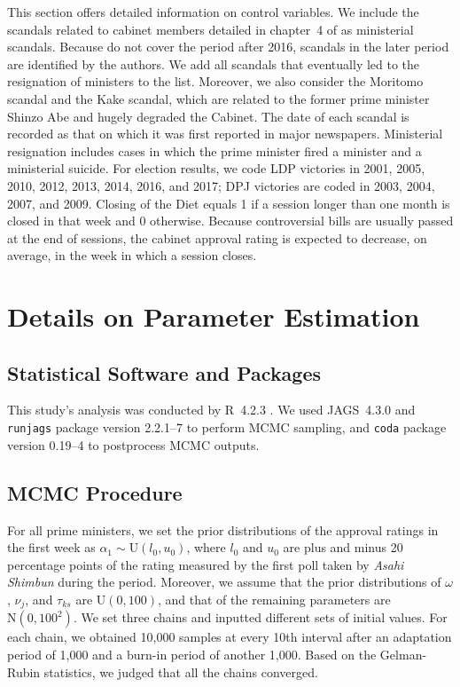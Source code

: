 \documentclass[12pt,letterpaper]{scrartcl}
\begin{document}
This section offers detailed information on control variables. We include the scandals related to cabinet members detailed in chapter~4 of \citet{Carlson2018} as ministerial scandals. Because \citet{Carlson2018} do not cover the period after 2016, scandals in the later period are identified by the authors. We add all scandals that eventually led to the resignation of ministers to the list. Moreover, we also consider the Moritomo scandal and the Kake scandal, which are related to the former prime minister Shinzo Abe and hugely degraded the Cabinet. The date of each scandal is recorded as that on which it was first reported in major newspapers. Ministerial resignation includes cases in which the prime minister fired a minister and a ministerial suicide. For election results, we code LDP victories in 2001, 2005, 2010, 2012, 2013, 2014, 2016, and 2017; DPJ victories are coded in 2003, 2004, 2007, and 2009. Closing of the Diet equals 1 if a session longer than one month is closed in that week and 0 otherwise. Because controversial bills are usually passed at the end of sessions, the cabinet approval rating is expected to decrease, on average, in the week in which a session closes.

\section{Details on Parameter Estimation}\label{app:sec:estimation}

\subsection{Statistical Software and Packages}

This study's analysis was conducted by R~4.2.3 \citep{R2023}. We used JAGS~4.3.0 \citep{Plummer2017} and \texttt{runjags} package version 2.2.1--7 \citep{Denwood2016JStatSoftware} to perform MCMC sampling, and \texttt{coda} package version 0.19--4 \citep{Plummer2006RNews} to postprocess MCMC outputs.

\subsection{MCMC Procedure}\label{app:subsec:mcmc}

For all prime ministers, we set the prior distributions of the approval ratings in the first week as $\alpha _{1}\sim \mathrm{U}(l_{0},u_{0})$, where $l_{0}$ and $u_{0}$ are plus and minus 20 percentage points of the rating measured by the first poll taken by \emph{Asahi Shimbun} during the period. Moreover, we assume that the prior distributions of $\omega $, $\nu _{j}$, and $\tau _{ks}$ are $\mathrm{U}(0,100)$, and that of the remaining parameters are $\mathrm{N}(0,100^{2})$. We set three chains and inputted different sets of initial values. For each chain, we obtained 10,000 samples at every 10th interval after an adaptation period of 1,000 and a burn-in period of another 1,000. Based on the Gelman-Rubin statistics, we judged that all the chains converged.
\end{document}
